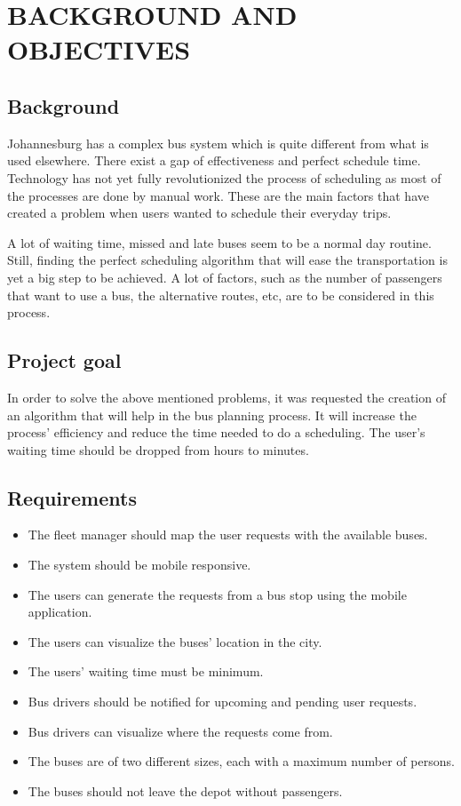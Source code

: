 \section{BACKGROUND AND OBJECTIVES}
\subsection{Background}
Johannesburg has a complex bus system which is quite different from what is used elsewhere. There exist a gap of effectiveness and perfect schedule time. Technology has not yet fully revolutionized the process of scheduling as most of the processes are done by manual work. These are the main factors that have created a problem when users wanted to schedule their everyday trips.

A lot of waiting time, missed and late buses seem to be a normal day routine. Still, finding the perfect scheduling algorithm that will ease the transportation is yet a big step to be achieved. A lot of factors, such as the number of passengers that want to use a bus, the alternative routes, etc, are to be considered in this process. 
\subsection{Project goal}
In order to solve the above mentioned problems, it was requested the creation of an algorithm that will help in the bus planning process. It will increase the process' efficiency and reduce the time needed to do a scheduling. The user’s waiting time should be dropped from hours to minutes. 
\subsection{Requirements}
\begin{itemize}
	\item The fleet manager should map the user requests with the available buses.
	\item The system should be mobile responsive.
	\item The users can generate the requests from a bus stop using the mobile application.
	\item The users can visualize the buses’ location in the city. 
	\item The users’ waiting time must be minimum.
	\item Bus drivers should be notified for upcoming and pending user requests.
	\item Bus drivers can visualize where the requests come from. 
	\item The buses are of two different sizes, each with a maximum number of persons.
	\item The buses should not leave the depot without passengers.
\end{itemize}


